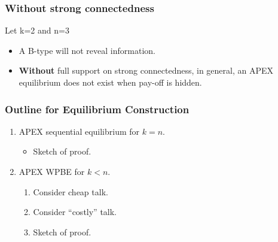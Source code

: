 \documentclass[8pt]{beamer}
\begin{document}
\begin{frame}
  \frametitle{Without strong connectedness}
Let k=\alert{2} and n=\alert{3}
\begin{center}
\end{center}

\begin{itemize}


\item A B-type will not reveal information.
\item \textbf{Without} {full support on strong connectedness}, in general, an APEX equilibrium does not exist when pay-off is hidden.

\end{itemize}
\end{frame}



\begin{frame}


  \frametitle{Outline for Equilibrium Construction}

\begin{enumerate}

\item APEX sequential equilibrium for $k=n$.
\begin{itemize}
\item Sketch of proof.
\end{itemize}
\item APEX WPBE for $k<n$.
\begin{enumerate}
\item Consider cheap talk.
\item Consider ``costly'' talk.
\item Sketch of proof.
\end{enumerate}
\end{enumerate}


\end{frame}
\end{document}

